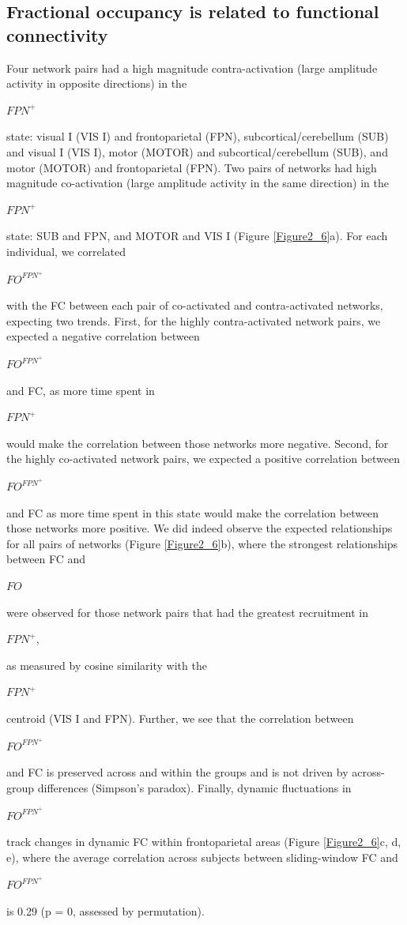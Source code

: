 \documentclass[phd,tocprelim]{cornell}
\begin{document}
    \subsection{Fractional occupancy is related to functional connectivity}
    Four network pairs had a high magnitude contra-activation (large amplitude activity in opposite directions) in the \begin{Large}$FPN^+$\end{Large} state: visual I (VIS I) and frontoparietal (FPN), subcortical/cerebellum (SUB) and visual I (VIS I), motor (MOTOR) and subcortical/cerebellum (SUB), and motor (MOTOR) and frontoparietal (FPN). Two pairs of networks had high magnitude co-activation (large amplitude activity in the same direction) in the \begin{Large}$FPN^+$\end{Large} state: SUB and FPN, and MOTOR and VIS I (Figure \ref{Figure2_6}a). For each individual, we correlated \begin{Large}$FO^{FPN^+}$\end{Large} with the FC between each pair of co-activated and contra-activated networks, expecting two trends. First, for the highly contra-activated network pairs, we expected a negative correlation between \begin{Large}$FO^{FPN^+}$\end{Large} and FC, as more time spent in \begin{Large}$FPN^+$\end{Large} would make the correlation between those networks more negative. Second, for the highly co-activated network pairs, we expected a positive correlation between \begin{Large}$FO^{FPN^+}$\end{Large} and FC as more time spent in this state would make the correlation between those networks more positive. We did indeed observe the expected relationships for all pairs of networks (Figure \ref{Figure2_6}b), where the strongest relationships between FC and \begin{Large}$FO$\end{Large} were observed for those network pairs that had the greatest recruitment in \begin{Large}$FPN^+$,\end{Large} as measured by cosine similarity with the \begin{Large}$FPN^+$\end{Large} centroid (VIS I and FPN). Further, we see that the correlation between \begin{Large}$FO^{FPN^+}$\end{Large} and FC is preserved across and within the groups and is not driven by across-group differences (Simpson's paradox).
    Finally, dynamic fluctuations in  \begin{Large}$FO^{FPN^+}$ \end{Large} track changes in dynamic FC within frontoparietal areas (Figure \ref{Figure2_6}c, d, e), where the average correlation across subjects between sliding-window FC and  \begin{Large}$FO^{FPN^+}$ \end{Large} is 0.29 (p = 0, assessed by permutation).
\end{document}
